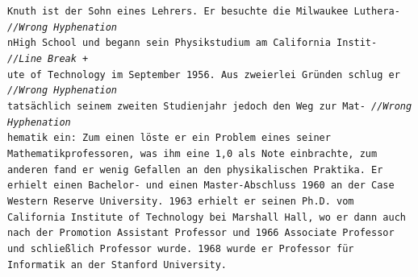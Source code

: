 \documentclass{beamer}
\begin{document}
\begin{frame}
\texttt{\scriptsize{K}\tiny nuth ist der Sohn eines Lehrers. Er besuchte die Milwaukee Luthera- \hskip 18pt \emph{//Wrong Hyphenation} \\
\scriptsize{n}\tiny  High School und begann sein Physikstudium am California Instit- \hskip 33pt \emph{//Line Break +} \\
\scriptsize{u}\tiny te of Technology im September 1956. Aus zweierlei Gründen schlug er \hskip 23pt \emph{//Wrong Hyphenation} \\
\scriptsize{t}\tiny atsächlich seinem zweiten Studienjahr jedoch den Weg zur Mat- \hskip 39pt \emph{//Wrong Hyphenation} \\
\scriptsize{h}\tiny ematik ein: Zum einen löste er ein Problem eines seiner \\
Mathematikprofessoren, was ihm eine 1,0 als Note einbrachte, zum \\
anderen fand er wenig Gefallen an den physikalischen Praktika. Er \\
erhielt einen Bachelor- und einen Master-Abschluss 1960 an der Case \\
Western Reserve University. 1963 erhielt er seinen Ph.D. vom \\
California Institute of Technology bei Marshall Hall, wo er dann auch \\
nach der Promotion Assistant Professor und 1966 Associate Professor \\
und schließlich Professor wurde. 1968 wurde er Professor für \\
Informatik an der Stanford University. \\}
\end{frame}
\end{document}
